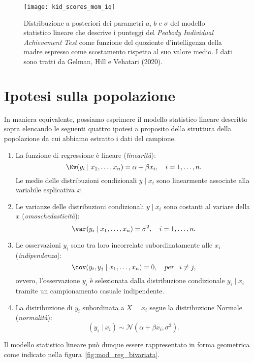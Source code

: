 \begin{figure} %
 \centering
 \texttt{[image: kid\_scores\_mom\_iq]}
 \caption{Distribuzione a posteriori dei parametri $a$, $b$ e $\sigma$ del modello statistico lineare che descrive i punteggi del \emph{Peabody Individual Achievement Test} come funzione del quoziente d'intelligenza della madre espresso come scostamento rispetto al suo valore medio.
I dati sono tratti da Gelman, Hill e Vehatari (2020). 
}
\label{fig:posterior_kid_score_mom_iq}
\end{figure}
 

\section{Ipotesi sulla popolazione}

In maniera equivalente, possiamo esprimere il modello statistico lineare descritto sopra elencando le seguenti quattro ipotesi a proposito della struttura della popolazione da cui abbiamo estratto i dati del campione.

\begin{enumerate}
\item La funzione di regressione è lineare (\emph{linearità}):
\begin{equation}
\Ev(y_i \mid x_1, \dots, x_n) = \alpha + \beta x_i, \quad
i=1, \dots, n.
\end{equation}
Le medie delle distribuzioni condizionali $y \mid x_i$ sono linearmente associate alla variabile esplicativa $x$.

\item Le varianze delle distribuzioni condizionali $y \mid x_i$ sono costanti al variare della $x$ (\emph{omoschedasticità}):
\begin{equation}
\var(y_i \mid x_1, \dots,  x_n) = \sigma^2, \quad i=1,
\dots, n. 
\end{equation}

\item Le osservazioni $y_i$ sono tra loro incorrelate subordinatamente alle $x_i$ (\emph{indipendenza}):
\begin{equation}
\cov(y_i, y_j \mid x_1, \dots, x_n) = 0, \quad per \hskip.1 in i \neq j, 
\end{equation}
ovvero, l'osservazione $y_i$ è selezionata dalla distribuzione condizionale $y_i \mid x_i$ tramite un campionamento casuale indipendente.

\item La distribuzione di $y_i$  subordinata a $X=x_i$ segue la distribuzione Normale (\emph{normalità}):
\begin{equation}
(y_i \mid x_i) \sim \mathcal{N}(\alpha+\beta x_i, \sigma^2).
\end{equation}
\end{enumerate}
Il modello statistico lineare può dunque essere rappresentato in forma geometrica come indicato nella figura~\ref{fig:mod_reg_bivariata}.

